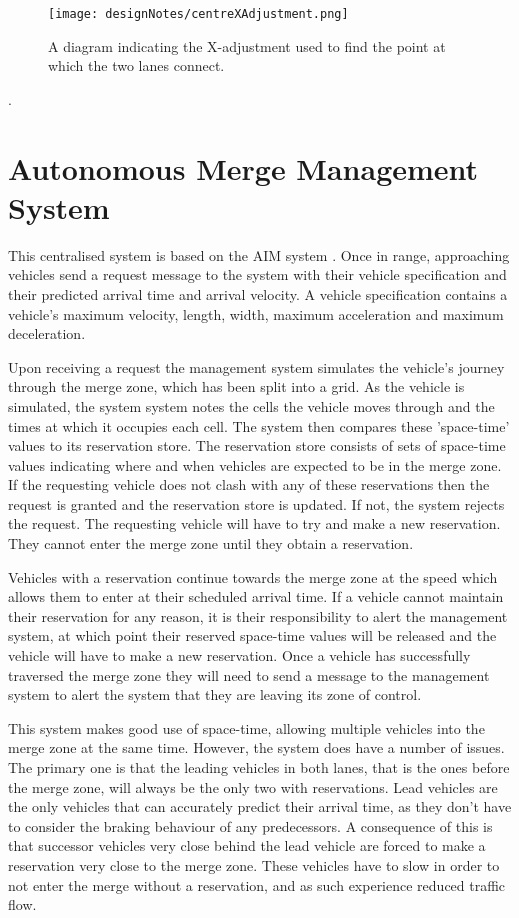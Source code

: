 \begin{figure}[htb]
\centering
\texttt{[image: designNotes/centreXAdjustment.png]}
\caption{A diagram indicating the X-adjustment used to find the point at which the two lanes connect.}
\label{fig:centreXAdjustment}
\end{figure}.

\section{Autonomous Merge Management System}
\label{sec:Autonomous Merge Management System}
This centralised system is based on the AIM system \citep{Dresner2004}. Once in range, approaching vehicles send a request message to the system with their vehicle specification and their predicted arrival time and arrival velocity. A vehicle specification contains a vehicle's maximum velocity, length, width, maximum acceleration and maximum deceleration.

Upon receiving a request the management system simulates the vehicle's journey through the merge zone, which has been split into a grid. As the vehicle is simulated, the system system notes the cells the vehicle moves through and the times at which it occupies each cell. The system then compares these 'space-time' values to its reservation store. The reservation store consists of sets of space-time values indicating where and when vehicles are expected to be in the merge zone. If the requesting vehicle does not clash with any of these reservations then the request is granted and the reservation store is updated. If not, the system rejects the request. The requesting vehicle will have to try and make a new reservation. They cannot enter the merge zone until they obtain a reservation.

Vehicles with a reservation continue towards the merge zone at the speed which allows them to enter at their scheduled arrival time. If a vehicle cannot maintain their reservation for any reason, it is their responsibility to alert the management system, at which point their reserved space-time values will be released and the vehicle will have to make a new reservation. Once a vehicle has successfully traversed the merge zone they will need to send a message to the management system to alert the system that they are leaving its zone of control. 

This system makes good use of space-time, allowing multiple vehicles into the merge zone at the same time. However, the system does have a number of issues. The primary one is that the leading vehicles in both lanes, that is the ones before the merge zone, will always be the only two with reservations. Lead vehicles are the only vehicles that can accurately predict their arrival time, as they don't have to consider the braking behaviour of any predecessors. A consequence of this is that successor vehicles very close behind the lead vehicle are forced to make a reservation very close to the merge zone. These vehicles have to slow in order to not enter the merge without a reservation, and as such experience reduced traffic flow.

